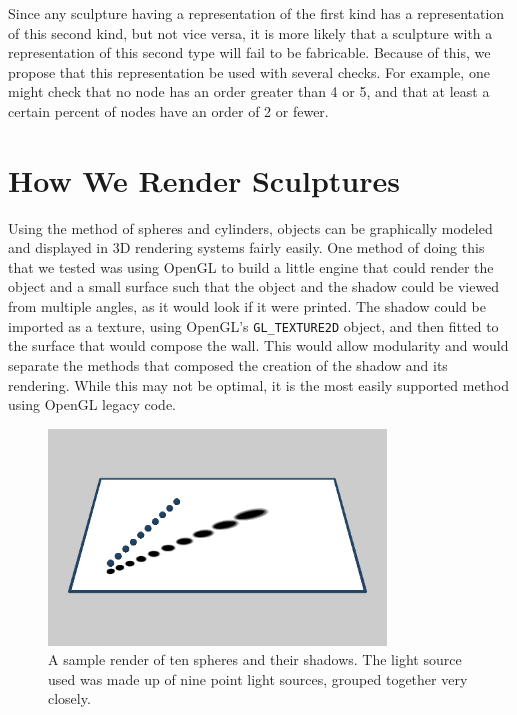 \documentclass[10pt]{article}
\begin{document}
Since any sculpture having a representation of the first kind has a representation of this second kind, but not vice versa, it is more likely that a sculpture with a representation of this second type will fail to be fabricable. Because of this, we propose that this representation be used with several checks. For example, one might check that no node has an order greater than 4 or 5, and that at least a certain percent of nodes have an order of 2 or fewer.

\section{How We Render Sculptures}
Using the method of spheres and cylinders, objects can be graphically modeled and displayed in 3D rendering systems fairly easily.  One method of doing this that we tested was using OpenGL to build a little engine that could render the object and a small surface such that the object and the shadow could be viewed from multiple angles, as it would look if it were printed.  The shadow could be imported as a texture, using OpenGL's \texttt{GL\_TEXTURE2D} object, and then fitted to the surface that would compose the wall.  This would allow modularity and would separate the methods that composed the creation of the shadow and its rendering.  While this may not be optimal, it is the most easily supported method using OpenGL legacy code.

\begin{figure}[h]
    \centering
    \includegraphics[width=0.8\textwidth]{object-render3.png}
    \caption{A sample render of ten spheres and their shadows.  The light source used was made up of nine point light sources, grouped together very closely.}
    \label{fig:render_3}
\end{figure}
\end{document}
